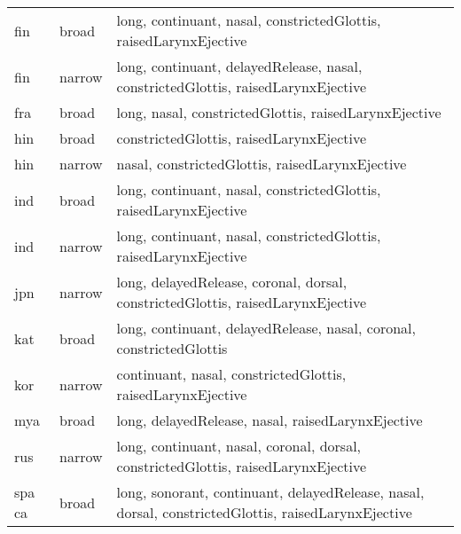 {\begin{tabularx}{1.1\textwidth}{|llX|}
fin                & broad         & long, continuant, nasal, constrictedGlottis, raisedLarynxEjective                                                                  \\
fin                & narrow        & long, continuant, delayedRelease, nasal, constrictedGlottis, raisedLarynxEjective                                                  \\
fra                & broad         & long, nasal, constrictedGlottis, raisedLarynxEjective                                                                              \\
hin                & broad         & constrictedGlottis, raisedLarynxEjective                                                                                           \\
hin                & narrow        & nasal, constrictedGlottis, raisedLarynxEjective                                                                                    \\
ind                & broad         & long, continuant, nasal, constrictedGlottis, raisedLarynxEjective                                                                  \\
ind                & narrow        & long, continuant, nasal, constrictedGlottis, raisedLarynxEjective                                                                  \\
jpn                & narrow        & long, delayedRelease, coronal, dorsal, constrictedGlottis, raisedLarynxEjective                                                    \\
kat                & broad    & long, continuant, delayedRelease, nasal, coronal, constrictedGlottis                                                               \\
kor                & narrow        & continuant, nasal, constrictedGlottis, raisedLarynxEjective                                                                        \\
mya                & broad    & long, delayedRelease, nasal, raisedLarynxEjective                                                                                  \\
rus                & narrow        & long, continuant, nasal, coronal, dorsal, constrictedGlottis, raisedLarynxEjective                                                 \\
spa ca             & broad         & long, sonorant, continuant, delayedRelease, nasal, dorsal, constrictedGlottis, raisedLarynxEjective                                \\

\end{tabularx}}
